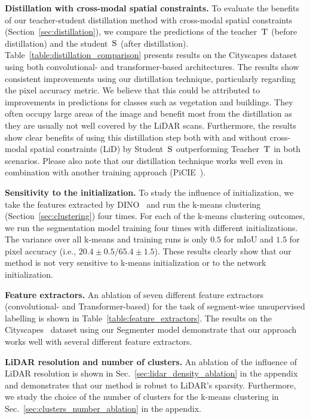 \documentclass[runningheads]{llncs}
\newcommand{\teacher}{\textsc{T}} \newcommand{\student}{\textsc{S}} \newcommand{\das}{D\&S\xspace}
\newcommand{\supp}{appendix\xspace}
\newcommand{\paragraphcustom}[1]{\smallskip\noindent\textbf{#1}}
\begin{document}
\paragraphcustom{Distillation with cross-modal spatial constraints.} 
To evaluate the benefits of our teacher-student distillation method with cross-modal spatial constraints (Section~\ref{sec:distillation}), we compare the predictions of the teacher~$\teacher $ (before distillation) and the student~$\student $ (after distillation).
Table~\ref{table:distillation_comparison} presents results on the Cityscapes dataset using both convolutional- and transformer-based architectures.
The results show consistent improvements using our distillation technique, particularly regarding the pixel accuracy metric. 
We believe that this could be attributed to improvements in predictions for classes such as vegetation and buildings. They often occupy large areas of the image and benefit most from the distillation as they are usually not well covered by the LiDAR scans. 
Furthermore, the results show clear benefits of using this distillation step both with and without cross-modal spatial constraints (LiD) by Student~$\student$ outperforming Teacher~$\teacher$ in both scenarios. 
Please also note that our distillation technique works well even in combination with another training approach (PiCIE~\cite{cho2021picie}). 


\paragraphcustom{Sensitivity to the initialization.}
To study the influence of initialization, we take the features extracted by DINO~\cite{caron2021emerging} and run the k-means clustering (Section~\ref{sec:clustering}) four times. 
For each of the k-means clustering outcomes, we run the segmentation model training four times with different initializations.
The variance over all k-means and training runs is only $0.5$ for mIoU and $1.5$ for pixel accuracy (i.e., $20.4\pm0.5 / 65.4\pm1.5$).
These results clearly show that our method is not very sensitive to k-means initialization or to the network initialization.

\paragraphcustom{Feature extractors.} 
An ablation of seven different feature extractors (convolutional- and Transformer-based) for the task of segment-wise unsupervised labelling is shown in Table~\ref{table:feature_extractors}. 
The results on the Cityscapes~\cite{Cordts2016Cityscapes} dataset using our Segmenter model demonstrate that our approach works well with several different feature extractors.

\paragraphcustom{LiDAR resolution and number of clusters.}
An ablation of the influence of LiDAR resolution is shown in Sec.~\ref{sec:lidar_density_ablation} in the 
\supp
and demonstrates that our method is robust to LiDAR’s sparsity.
Furthermore, we study the choice of the number of clusters for the k-means clustering in Sec.~\ref{sec:clusters_number_ablation} in the 
\supp.
\end{document}
